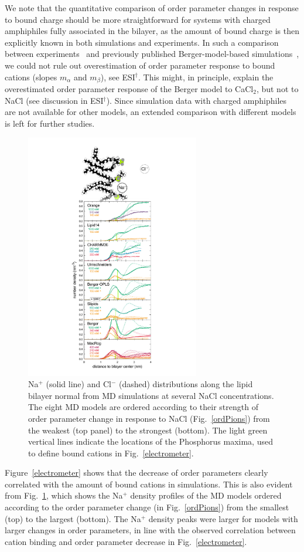 \documentclass[twoside,twocolumn,9pt]{article}
\begin{document}
We note that
the quantitative comparison of order parameter changes in response to bound charge should be more straightforward for
systems with charged amphiphiles fully associated in the bilayer, as the amount of bound charge
is then explicitly known in both simulations and experiments. In such a comparison
between experiments~\cite{scherer89,franzin98} and previously published Berger-model-based simulations~\cite{miettinen09},
we could not rule out
overestimation of order parameter response to bound cations (slopes $m_\alpha$ and $m_\beta$), see ESI$^\dag$.
This might, in principle, explain the overestimated order parameter 
response of the Berger model to CaCl$_2$, but not to NaCl (see discussion in ESI$^\dag$).
Since simulation data with charged amphiphiles are not available for other models,
an extended comparison with different models is left for further studies.

\begin{figure}[!h]
  \centering
  \includegraphics[width=7.595cm]{../Fig/NaDensities_withSnap.pdf}
  \caption{\label{NAdensities}
    Na$^+$ (solid line) and Cl$^-$ (dashed) distributions along the lipid bi\-layer normal from MD simulations
    at several NaCl concentrations.
    The eight MD models are ordered according to their strength of order parameter change in response to NaCl
    (Fig.~\ref{ordPions})
    from the weakest (top panel) to the strongest (bottom).
    The light green vertical lines indicate the locations of the Phosphorus maxima,
    used to define bound cations in Fig.~\ref{electrometer}.
}
\end{figure}
%
Figure~\ref{electrometer} shows that the decrease of order parameters clearly correlated with the
amount of bound cations in simulations. This is also evident from Fig.~\ref{NAdensities},
which shows the Na$^+$ density profiles of the MD models ordered according to the order parameter change 
(in Fig.~\ref{ordPions}) from the smallest (top) to the largest (bottom).
The Na$^+$ density peaks were larger for models with larger changes in order parameters,
in line with the observed correlation between cation binding and order parameter decrease in
Fig.~\ref{electrometer}.
\end{document}
